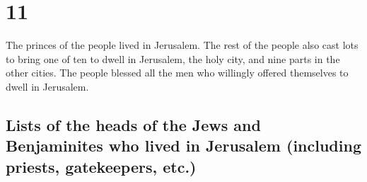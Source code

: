 \hypertarget{section-10}{%
\section{11}\label{section-10}}

 The princes of the people lived in Jerusalem. The rest of
the people also cast lots to bring one of ten to dwell in Jerusalem, the
holy city, and nine parts in the other cities.  The people
blessed all the men who willingly offered themselves to dwell in
Jerusalem.

\hypertarget{lists-of-the-heads-of-the-jews-and-benjaminites-who-lived-in-jerusalem-including-priests-gatekeepers-etc.}{%
\subsection{Lists of the heads of the Jews and Benjaminites who lived in
Jerusalem (including priests, gatekeepers,
etc.)}\label{lists-of-the-heads-of-the-jews-and-benjaminites-who-lived-in-jerusalem-including-priests-gatekeepers-etc.}}

